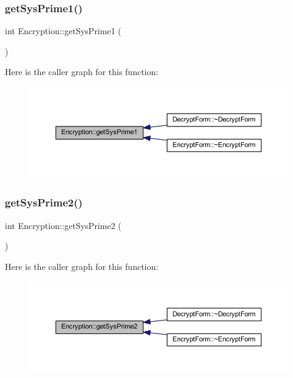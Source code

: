 \subsubsection{\texorpdfstring{get\+Sys\+Prime1()}{getSysPrime1()}}
{\footnotesize\ttfamily int Encryption\+::get\+Sys\+Prime1 (\begin{DoxyParamCaption}{ }\end{DoxyParamCaption})}

Here is the caller graph for this function\+:
\nopagebreak
\begin{figure}[H]
\begin{center}
\leavevmode
\includegraphics[width=350pt]{class_encryption_ab182872a04d40023eebb199abfe81896_icgraph}
\end{center}
\end{figure}
\hypertarget{class_encryption_a4a18c3b332487ec393c3ddf06c39c48f}{}\label{class_encryption_a4a18c3b332487ec393c3ddf06c39c48f} 
\subsubsection{\texorpdfstring{get\+Sys\+Prime2()}{getSysPrime2()}}
{\footnotesize\ttfamily int Encryption\+::get\+Sys\+Prime2 (\begin{DoxyParamCaption}{ }\end{DoxyParamCaption})}

Here is the caller graph for this function\+:
\nopagebreak
\begin{figure}[H]
\begin{center}
\leavevmode
\includegraphics[width=350pt]{class_encryption_a4a18c3b332487ec393c3ddf06c39c48f_icgraph}
\end{center}
\end{figure}
\hypertarget{class_encryption_a8ddf113b231bf2f60d5714cdf0d07857}{}\label{class_encryption_a8ddf113b231bf2f60d5714cdf0d07857} 
